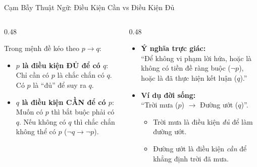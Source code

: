 \documentclass[aspectratio=169, 10pt]{beamer}
\begin{document}
\begin{frame}{Cạm Bẫy Thuật Ngữ: Điều Kiện Cần vs Điều Kiện Đủ}
  \begin{columns}[t, onlytextwidth]
    \begin{column}{0.48\textwidth}
      \begin{cozyTrap}
        \small
        Trong mệnh đề kéo theo $p \to q$:
        \begin{itemize}
          \setlength{\itemsep}{3pt}
          \item \textbf{$p$ là điều kiện ĐỦ để có $q$}:\\
          Chỉ cần có $p$ là chắc chắn có $q$. Có $p$ là ``đủ'' để suy ra $q$.
          \item \textbf{$q$ là điều kiện CẦN để có $p$}:\\
          Muốn có $p$ thì bắt buộc phải có $q$. Nếu không có $q$ thì chắc chắn không thể có $p$ ($\neg q \to \neg p$).
        \end{itemize}
      \end{cozyTrap}
    \end{column}
    \begin{column}{0.48\textwidth}
      \begin{cozyMethod}
        \small
        \begin{itemize}
          \setlength{\itemsep}{3pt}
          \item \textbf{Ý nghĩa trực giác:}\\
          ``Để không vi phạm lời hứa, hoặc là không có tiền đề ràng buộc ($\neg p$), hoặc là đã thực hiện kết luận ($q$).''
          \item \textbf{Ví dụ đời sống:}\\
          ``Trời mưa ($p$) $\to$ Đường ướt ($q$)''.
          \begin{itemize}
            \item Trời mưa là điều kiện \textit{đủ} để làm đường ướt.
            \item Đường ướt là điều kiện \textit{cần} để khẳng định trời đã mưa.
          \end{itemize}
        \end{itemize}
      \end{cozyMethod}
    \end{column}
  \end{columns}
\end{frame}
\end{document}
